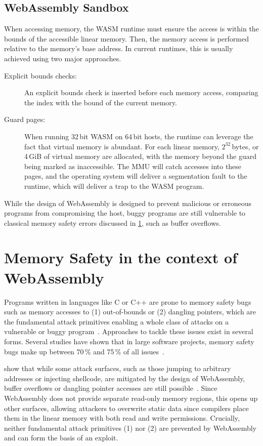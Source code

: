 \subsection{WebAssembly Sandbox}
\label{subsec:webassembly-sandbox}
When accessing memory, the \ac{WASM} runtime must ensure the access is within the bounds of the accessible linear memory.
Then, the memory access is performed relative to the memory's base address.
In current runtimes, this is usually achieved using two major approaches.
\begin{description}
    \item[Explicit bounds checks:] An explicit bounds check is inserted before each memory access, comparing the index with the bound of the current memory.
    \item[Guard pages:] When running 32\,bit \ac{WASM} on 64\,bit hosts, the runtime can leverage the fact that virtual memory is abundant.
    For each linear memory, $2^{32}$\,bytes, or 4\,GiB of virtual memory are allocated, with the memory beyond the guard being marked as inaccessible.
    The \ac{MMU} will catch accesses into these pages, and the operating system will deliver a segmentation fault to the runtime, which will deliver a trap to the \ac{WASM} program.
\end{description}


While the design of WebAssembly is designed to prevent malicious or erroneous programs from compromising the host, buggy programs are still vulnerable to classical memory safety errors discussed in \cref{sec:memory-safety-wasm}, such as buffer overflows.

\section{Memory Safety in the context of WebAssembly}
\label{sec:memory-safety-wasm}

Programs written in languages like C or C++ are prone to memory safety bugs such as memory accesses to (1) out-of-bounds or (2) dangling pointers, which are the fundamental attack primitives enabling a whole class of attacks on a vulnerable or buggy program~\cite{szekeres2013sok}.
Approaches to tackle these issues exist in several forms.
Several studies have shown that in large software projects, memory safety bugs make up between 70\,\% and 75\,\% of all issues~\cite{chromium_memory_safety,microsoft_memory_safety,android_memory_safety}.

\citeauthor*{lehmann2020everything} show that while some attack surfaces, such as those jumping to arbitrary addresses or injecting shellcode, are mitigated by the design of WebAssembly, buffer overflows or dangling pointer accesses are still possible~\cite{lehmann2020everything}.
Since WebAssembly does not provide separate read-only memory regions, this opens up other surfaces, allowing attackers to overwrite static data since compilers place them in the linear memory with both read and write permissions.
Crucially, neither fundamental attack primitives (1) nor (2) are prevented by WebAssembly and can form the basis of an exploit.

